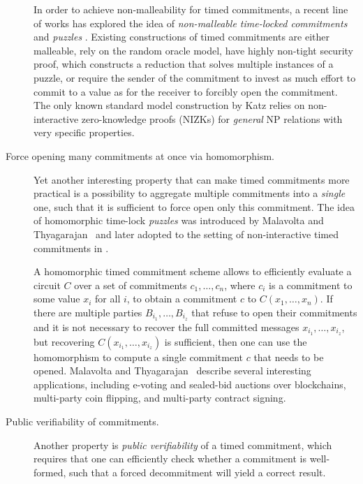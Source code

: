 \begin{description}
	In order to achieve non-malleability for timed commitments, a recent line of works has explored the idea of \emph{non-malleable time-locked commitments} and \emph{puzzles} \cite{TCC:KatLosXu20,CCS:TCLM21,EPRINT:EFKP20a,EC:BDDNO21}.
%
%
	Existing constructions of timed commitments are either malleable, rely on the random oracle model, have highly non-tight security proof, which constructs a reduction that solves multiple instances of a puzzle, or require the sender of the commitment to invest as much effort to commit to a value as for the receiver to forcibly open the commitment. 
%
	The only known standard model construction by Katz \etal \cite{TCC:KatLosXu20} relies on non-interactive zero-knowledge proofs (NIZKs) for \emph{general} NP relations with very specific properties. 



	

	\item[Force opening many commitments at once via homomorphism.] 
	Yet another interesting property that can make timed commitments more practical is a possibility to aggregate multiple commitments into a \emph{single} one, such that it is sufficient to force open only this commitment. {The idea of homomorphic time-lock \emph{puzzles} was introduced by Malavolta and Thyagarajan~\cite{C:MalThy19} and later adopted to the setting of non-interactive timed commitments in \cite{CCS:TCLM21}.} 

	A homomorphic timed commitment scheme allows to efficiently evaluate a circuit $C$ over a set of commitments $c_1, \ldots, c_n$, where $c_i$ is a commitment to some value $x_i$ for all $i$, to obtain a commitment $c$ to $C(x_1, \ldots, x_n)$. 
	If there are multiple parties $B_{i_1}, \ldots, B_{i_z}$ that refuse to open their commitments and it is not necessary to recover the full committed messages $x_{i_1}, \ldots, x_{i_z}$, but recovering $C(x_{i_1}, \ldots, x_{i_z})$ is sufficient, then one can use the homomorphism to compute a single commitment $c$ that needs to be opened. Malavolta and Thyagarajan~\cite{C:MalThy19} describe several interesting applications, including e-voting and sealed-bid auctions over blockchains, multi-party coin flipping, and multi-party contract signing.

	\item[Public verifiability of commitments.] 
	Another property is \emph{public verifiability} of a timed commitment, which requires that one can efficiently check whether a commitment is well-formed, such that a forced decommitment will yield a correct result. 


\end{description}
